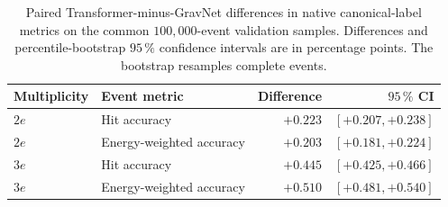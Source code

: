 \begin{table}[htbp]
    \centering
    \small
    \setlength{\tabcolsep}{7pt}
    \caption{Paired Transformer-minus-GravNet differences in native
    canonical-label metrics on the common \(100{,}000\)-event validation
    samples. Differences and percentile-bootstrap \(95\,\%\) confidence
    intervals are in percentage points. The bootstrap resamples complete
    events.}
    \label{tab:results_baseline_paired}
    \begin{tabular}{llrr}
        \hline
        Multiplicity & Event metric & Difference & \(95\,\%\) CI \\
        \hline
        \(2e\) & Hit accuracy & \(+0.223\) & \([+0.207,+0.238]\) \\
        \(2e\) & Energy-weighted accuracy & \(+0.203\) & \([+0.181,+0.224]\) \\
        \(3e\) & Hit accuracy & \(+0.445\) & \([+0.425,+0.466]\) \\
        \(3e\) & Energy-weighted accuracy & \(+0.510\) & \([+0.481,+0.540]\) \\
        \hline
    \end{tabular}
\end{table}
